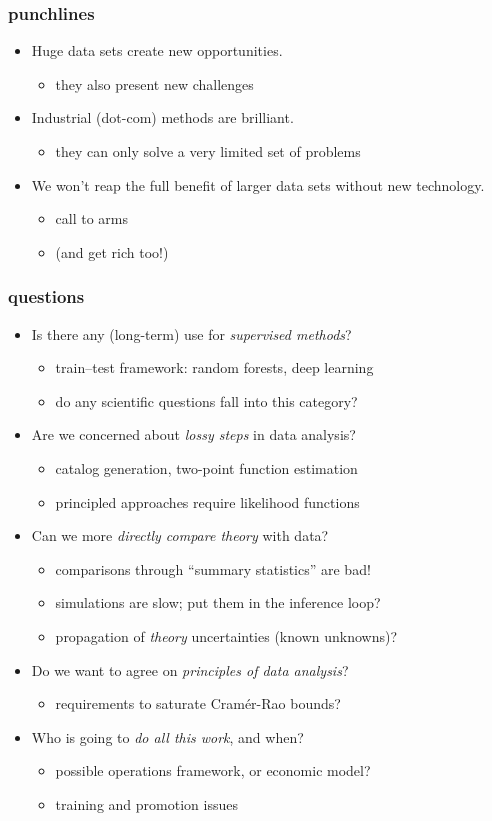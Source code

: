 \documentclass[pdftex]{beamer}
\newcommand{\conclusion}{
\begin{frame}
  \frametitle{punchlines}
  \begin{itemize}
  \item Huge data sets create new opportunities.
    \begin{itemize}
    \item they also present new challenges
    \end{itemize}
  \item Industrial (dot-com) methods are brilliant.
    \begin{itemize}
    \item they can only solve a very limited set of problems
    \end{itemize}
  \item We won't reap the full benefit of larger data sets without new technology.
    \begin{itemize}
    \item call to arms
    \item (and get rich too!)
    \end{itemize}
  \end{itemize}
\end{frame}
}
\begin{document}
\conclusion

\begin{frame}
  \frametitle{questions}
  \begin{itemize}
  \item Is there any (long-term) use for \emph{supervised methods}?
    \begin{itemize}
    \item train--test framework: random forests, deep learning
    \item do any scientific questions fall into this category?
    \end{itemize}
  \item Are we concerned about \emph{lossy steps} in data analysis?
    \begin{itemize}
    \item catalog generation, two-point function estimation
    \item principled approaches require likelihood functions
    \end{itemize}
  \item Can we more \emph{directly compare theory} with data?
    \begin{itemize}
    \item comparisons through ``summary statistics'' are bad!
    \item simulations are slow; put them in the inference loop?
    \item propagation of \emph{theory} uncertainties (known unknowns)?
    \end{itemize}
  \item Do we want to agree on \emph{principles of data analysis}?
    \begin{itemize}
    \item requirements to saturate Cram\'er-Rao bounds?
    \end{itemize}
  \item Who is going to \emph{do all this work}, and when?
    \begin{itemize}
    \item possible operations framework, or economic model?
    \item training and promotion issues
    \end{itemize}
  \end{itemize}
\end{frame}
\end{document}
